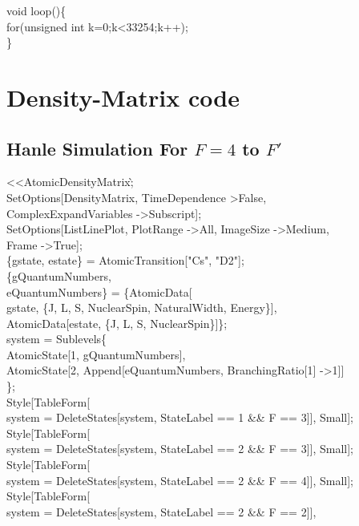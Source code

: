 \noindent void loop()\{\\
	for(unsigned int k=0;k\textless 33254;k++);\\
\}


\chapter{Density-Matrix code}

\section{Hanle Simulation For $F=4$ to $F'$}

\textless\textless AtomicDensityMatrix\`;\\
SetOptions[DensityMatrix, TimeDependence \textgreater False, \\
  ComplexExpandVariables -\textgreater Subscript];\\
SetOptions[ListLinePlot, PlotRange -\textgreater All, ImageSize -\textgreater Medium, \\
  Frame -\textgreater True];\\
\{gstate, estate\} = AtomicTransition["Cs", "D2"];\\
\{gQuantumNumbers, \\
   eQuantumNumbers\} = \{AtomicData[\\
    gstate, \{J, L, S, NuclearSpin, NaturalWidth, Energy\}],\\
   AtomicData[estate, \{J, L, S, NuclearSpin\}]\};\\
system = Sublevels\@\{\\
    AtomicState[1, gQuantumNumbers], \\
    AtomicState[2, Append[eQuantumNumbers, BranchingRatio[1] -\textgreater 1]]\\
    \};\\
Style[TableForm[\\
   system = DeleteStates[system, StateLabel == 1 \&\& F == 3]], Small];\\
Style[TableForm[\\
   system = DeleteStates[system, StateLabel == 2 \&\& F == 3]], Small];\\
Style[TableForm[\\
   system = DeleteStates[system, StateLabel == 2 \&\& F == 4]], Small];\\
Style[TableForm[\\
   system = DeleteStates[system, StateLabel == 2 \&\& F == 2]],\\
